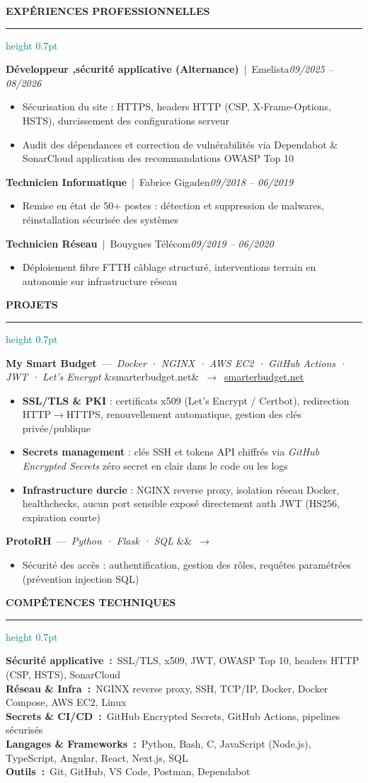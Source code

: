 \documentclass[a4paper,10pt]{article}
\newcommand{\cvsection}[1]{%
  \vspace{5pt}%
  {\color{navy}\textbf{\uppercase{#1}}}%
  \vspace{2pt}%
  \textcolor{teal}{\hrule height 0.7pt}%
  \vspace{3pt}%
}
\newcommand{\cventry}[4]{%
  \vspace{4pt}%
  {\color{navy}\textbf{#1}}~{\color{gray}|~#2}\hfill{\color{gray}\textit{\footnotesize #3}}\\[-1pt]
  #4%
}
\newcommand{\cvbullet}[1]{%
  \begin{itemize}[leftmargin=1em, itemsep=1pt, topsep=1pt, parsep=0pt]
    \item[\textcolor{teal}{\footnotesize--}] {\small\raggedright #1}
  \end{itemize}%
}
\newcommand{\cvproject}[5]{%
  \vspace{4pt}%
  {\color{navy}\textbf{#1}}~{\color{gray}---}~{\color{teal}\itshape\small #2}%
  \ifx&#3&\else~{\color{gray}$\rightarrow$}~\href{#4}{\small #3}\fi\\[-1pt]
  #5%
}
\newcommand{\skillrow}[2]{%
  \vspace{3pt}%
  {\color{navy}\textbf{#1~:}}~{\small #2}\\%
}
\begin{document}
\vspace{6pt}

\cvsection{Expériences professionnelles}

\cventry{Développeur ,sécurité applicative (Alternance)}{Emelista}{09/2025 -- 08/2026}{%
  \cvbullet{Sécurisation du site : HTTPS, headers HTTP (CSP, X-Frame-Options, HSTS), durcissement des configurations serveur}
  \cvbullet{Audit des dépendances et correction de vulnérabilités via Dependabot \& SonarCloud  application des recommandations OWASP Top 10}
}

\cventry{Technicien Informatique}{Fabrice Gigaden}{09/2018 -- 06/2019}{%
  \cvbullet{Remise en état de 50+ postes : détection et suppression de malwares, réinstallation sécurisée des systèmes}
}

\cventry{Technicien Réseau}{Bouygues Télécom}{09/2019 -- 06/2020}{%
  \cvbullet{Déploiement fibre FTTH  câblage structuré, interventions terrain en autonomie sur infrastructure réseau}
}

\vspace{4pt}

\cvsection{Projets}

\cvproject{My Smart Budget}{Docker · NGINX · AWS EC2 · GitHub Actions · JWT · Let's Encrypt}{smarterbudget.net}{https://smarterbudget.net}{%
  \cvbullet{\textbf{SSL/TLS \& PKI} : certificats x509 (Let's Encrypt / Certbot), redirection HTTP$\rightarrow$HTTPS, renouvellement automatique, gestion des clés privée/publique}
  \cvbullet{\textbf{Secrets management} : clés SSH et tokens API chiffrés via \textit{GitHub Encrypted Secrets}  zéro secret en clair dans le code ou les logs}
  \cvbullet{\textbf{Infrastructure durcie} : NGINX reverse proxy, isolation réseau Docker, healthchecks, aucun port sensible exposé directement  auth JWT (HS256, expiration courte)}
}

\cvproject{ProtoRH}{Python · Flask · SQL}{}{}{%
  \cvbullet{Sécurité des accès : authentification, gestion des rôles, requêtes paramétrées (prévention injection SQL)}
}

\vspace{3pt}

\cvsection{Compétences techniques}

\skillrow{Sécurité applicative}{SSL/TLS, x509, JWT, OWASP Top 10, headers HTTP (CSP, HSTS), SonarCloud}
\skillrow{Réseau \& Infra}{NGINX reverse proxy, SSH, TCP/IP, Docker, Docker Compose, AWS EC2, Linux}
\skillrow{Secrets \& CI/CD}{GitHub Encrypted Secrets, GitHub Actions, pipelines sécurisés}
\skillrow{Langages \& Frameworks}{Python, Bash, C, JavaScript (Node.js), TypeScript, Angular, React, Next.js, SQL}
\skillrow{Outils}{Git, GitHub, VS Code, Postman, Dependabot}
\end{document}
